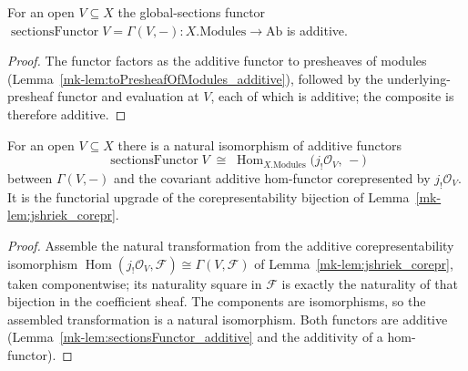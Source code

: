 \begin{lemma}\label{mk-lem:sectionsFunctor_additive}
  \leanok

  For an open \(V \subseteq X\) the global-sections functor
  \(\operatorname{sectionsFunctor} V = \Gamma(V, -) : X.\mathrm{Modules} \to \mathrm{Ab}\) is
  additive.
\end{lemma}
\begin{proof}
  \leanok
  The functor factors as the additive functor to presheaves of modules
  (Lemma~\ref{mk-lem:toPresheafOfModules_additive}), followed by the underlying-presheaf functor and
  evaluation at \(V\), each of which is additive; the composite is therefore additive.
\end{proof}

\begin{lemma}\label{mk-lem:sectionsFunctorCorepIso}
  \leanok

  For an open \(V \subseteq X\) there is a natural isomorphism of additive functors
  \[
    \operatorname{sectionsFunctor} V
      \;\cong\;
    \operatorname{Hom}_{X.\mathrm{Modules}}\bigl(j_!\mathcal{O}_V,\, -\bigr)
  \]
  between \(\Gamma(V, -)\) and the covariant additive hom-functor corepresented by
  \(j_!\mathcal{O}_V\). It is the functorial upgrade of the corepresentability bijection of
  Lemma~\ref{mk-lem:jshriek_corepr}.
\end{lemma}
\begin{proof}
  \leanok
  Assemble the natural transformation from the additive corepresentability isomorphism
  \(\operatorname{Hom}(j_!\mathcal{O}_V, \mathcal{F}) \cong \Gamma(V, \mathcal{F})\) of
  Lemma~\ref{mk-lem:jshriek_corepr}, taken componentwise; its naturality square in \(\mathcal{F}\) is
  exactly the naturality of that bijection in the coefficient sheaf. The components are
  isomorphisms, so the assembled transformation is a natural isomorphism. Both functors are
  additive (Lemma~\ref{mk-lem:sectionsFunctor_additive} and the additivity of a hom-functor).
\end{proof}

